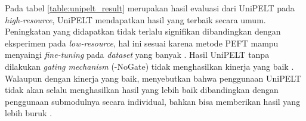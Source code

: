 \begin{table}[ht]
    \vspace{0.25cm}
    \centering
    \caption{Hasil evaluasi UniPELT pada \textit{high-resource} \parencite{unipelt}}
    \label{table:unipelt_result}
\end{table}

Pada tabel \ref{table:unipelt_result} merupakan hasil evaluasi dari UniPELT pada \textit{high-resource}, UniPELT mendapatkan hasil yang terbaik secara umum. Peningkatan yang didapatkan tidak terlalu signifikan dibandingkan dengan eksperimen pada \textit{low-resource}, hal ini sesuai karena metode PEFT mampu menyaingi \textit{fine-tuning} pada \textit{dataset} yang banyak \parencite{unipelt}. Hasil UniPELT tanpa dilakukan \textit{gating mechanism} (-NoGate) tidak menghasilkan kinerja yang baik \parencite{unipelt}. Walaupun dengan kinerja yang baik, \citeauthor{unipelt} menyebutkan bahwa penggunaan UniPELT tidak akan selalu menghasilkan hasil yang lebih baik dibandingkan dengan penggunaan submodulnya secara individual, bahkan bisa memberikan hasil yang lebih buruk \parencite{unipelt}.

